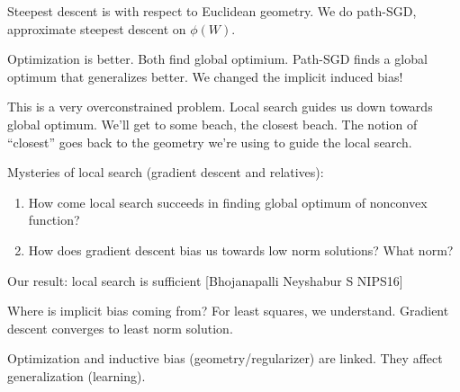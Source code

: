 Steepest descent is with respect to Euclidean geometry. We do path-SGD, approximate steepest descent on $\phi(W)$. 

Optimization is better. Both find global optimium. Path-SGD finds a global optimum that generalizes better. We changed the implicit induced bias!

This is a very overconstrained problem. Local search guides us down towards global optimum. We'll get to some beach, the closest beach. The notion of ``closest'' goes back to the geometry we're using to guide the local search. %

Mysteries of local search (gradient descent and relatives):
\begin{enumerate}
\item
How come local search succeeds in finding global optimum of nonconvex function?
\item
How does gradient descent bias us towards low norm solutions? What norm?
\end{enumerate}

Our result: local search is sufficient [Bhojanapalli Neyshabur S NIPS16]


Where is implicit bias coming from? For least squares, we understand. Gradient descent converges to least norm solution. %

Optimization and inductive bias (geometry/regularizer) are linked. They affect generalization (learning). 

